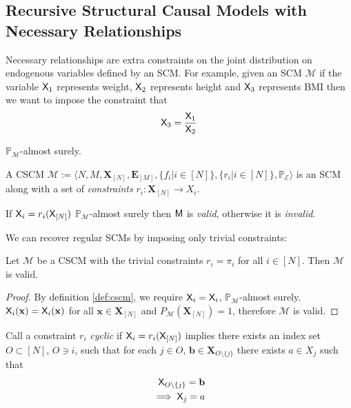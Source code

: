 \subsection{Recursive Structural Causal Models with Necessary Relationships}

Necessary relationships are extra constraints on the joint distribution on endogenous variables defined by an SCM. For example, given an SCM $\mathcal{M}$ if the variable $\mathsf{X}_1$ represents weight, $\mathsf{X}_2$ represents height and $\mathsf{X}_3$ represents BMI then we want to impose the constraint that
\begin{align}
	\mathsf{X}_3 = \frac{\mathsf{X}_1}{\mathsf{X}_2}
\end{align}

$\mathbb{P}_{\mathcal{M}}$-almost surely.

\begin{definition}\label{def:cscm}
	A CSCM $\mathcal{M}:= \langle N,M,\mathbf{X}_{[N]},\mathbf{E}_{[M]},\{f_i|i\in[N]\},\{r_i|i\in [N]\},\mathbb{P}_{\mathcal{E}}\rangle$ is an SCM along with a set of \emph{constraints} $r_i:\mathbf{X}_{[N]}\to X_i$. 

	If $\mathsf{X}_i=r_i(\mathsf{X}_{[N]})$ $\mathbb{P}_{\mathcal{M}}$-almost surely then $\mathsf{M}$ is \emph{valid}, otherwise it is \emph{invalid}.
\end{definition}

We can recover regular SCMs by imposing only trivial constraints:

\begin{lemma}
	Let $\mathcal{M}$ be a CSCM with the trivial constraints $r_i=\pi_i$ for all $i\in[N]$. Then $\mathcal{M}$ is valid.
\end{lemma}

\begin{proof}
	By definition \ref{def:cscm}, we require $\mathsf{X}_i = \mathsf{X}_i$, $\mathbb{P}_{\mathcal{M}}$-almost surely. $\mathsf{X}_i(\mathbf{x}) = \mathsf{X}_i(\mathbf{x})$ for all $\mathbf{x}\in\mathbf{X}_{[N]}$ and $P_\mathcal{M}(\mathbf{X}_{[N]})=1$, therefore $\mathcal{M}$ is valid.
\end{proof}

Call a constraint $r_i$ \emph{cyclic} if $\mathsf{X}_i = r_i(\mathsf{X}_{[N]})$ implies there exists an index set $O\subset[N]$, $O\ni i$, such that for each $j\in O$, $\mathbf{b}\in \mathbf{X}_{O\setminus\{j\}}$ there exists $a\in X_j$ such that
\begin{align}
	\mathsf{X}_{O\setminus \{j\}} = \mathbf{b}\\
	\implies \mathsf{X}_j = a
\end{align}

